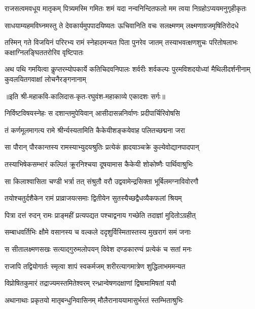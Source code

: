 \fourlineindentedshloka
{राजसत्वमवधूय मातृकम्}
{पित्र्यमस्मि गमितः शमं यदा}
{नन्वनिन्दितफलो मम त्वया}
{निग्रहोऽप्ययमनुगृहीकृतः} %

\fourlineindentedshloka
{साधयाम्यहमविघ्नमस्तु ते}
{देवकार्यमुपपादयिष्यतः}
{ऊचिवानिति वचः सलक्ष्मणम्}
{लक्ष्मणाग्रजमृषितिरोदधे} %

\fourlineindentedshloka
{तस्मिन् गते विजयिनं परिरभ्य रामं}
{स्नेहादमन्यत पिता पुनरेव जातम्}
{तस्याभवत्क्षणशुचः परितोषलाभः}
{कक्षाग्निलङ्घिततरोरिव वृष्टिपातः} %

\fourlineindentedshloka
{अथ पथि गमयित्वा कॢप्तरम्योपकार्ये}
{कतिचिदवनिपालः शर्वरीः शर्वकल्पः}
{पुरमविशदयोध्यां मैथिलीदर्शनीनाम्}
{कुवलयितगवाक्षां लोचनैरङ्गनानाम्} %

॥इति श्री-महाकवि-कालिदास-कृत-रघुवंश-महाकाव्ये एकादशः सर्गः॥

\twolineshloka
{निर्विष्टविषयस्नेहः स दशान्तमुपेयिवान्}
{आसीदासन्ननिर्वाणः प्रदीपार्चिरिवोषसि} %

\twolineshloka
{तं कर्णमूलमागत्य रामे श्रीर्न्यस्यतामिति}
{कैकेयीशङ्कयेवाह पलितच्छद्मना जरा} %

\twolineshloka
{सा पौरान् पौरकान्तस्य रामस्याभ्युदयश्रुतिः}
{प्रत्येकं ह्रादयाञ्चक्रे कुल्येवोद्यानपादपान्} %

\twolineshloka
{तस्याभिषेकसम्भारं कल्पितं क्रूरनिश्चया}
{दूषयामास कैकेयी शोकोष्णैः पार्थिवाश्रुभिः} %

\twolineshloka
{सा किलाश्वासिता चण्डी भर्त्रा तत् संश्रुतौ वरौ}
{उद्ववामेन्द्रसिक्ता भूर्बिलमग्नाविवोरगौ} %

\twolineshloka
{तयोश्चतुर्दशैकेन रामं प्राव्राजयत्समाः}
{द्वितीयेन सुतस्यैच्छद्वैधव्यैकफलां श्रियम्} %

\twolineshloka
{पित्रा दत्तं रुदन् रामः प्राङ्महीं प्रत्यपद्यत}
{पश्चाद्वनाय गच्छेति तदाज्ञां मुदितोऽग्रहीत्} %

\twolineshloka
{सम्बाधवर्तिभिः क्षौमे वसानस्य च वल्कले}
{ददृशुर्विस्मितास्तस्य मुखरागं समं जनाः} %

\twolineshloka
{स सीतालक्ष्मणसखः सत्याद्गुरुमलोपयन्}
{विवेश दण्डकारण्यं प्रत्येकं च सतां मनः} %

\twolineshloka
{राजापि तद्वियोगार्तः स्मृत्वा शापं स्वकर्मजम्}
{शरीरत्यागमात्रेण शुद्धिलाभममन्यत} %

\twolineshloka
{विप्रोषितकुमारं तद्राज्यमस्तमितेश्वरम्}
{रन्ध्रान्वेषणदक्षाणां द्विषामामिषतां ययौ} %

\twolineshloka
{अथानाथाः प्रकृतयो मातृबन्धुनिवासिनम्}
{मौलैरानाययामासुर्भरतं स्तम्भिताश्रुभिः} %

